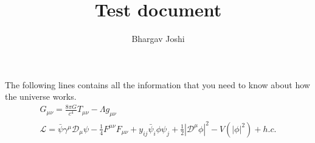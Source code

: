 \documentclass{article}
\author{Bhargav Joshi}
\title{Test document}
\begin{document}
\maketitle
\centering
The following lines contains all the information that you need to know about how the universe works.
\begin{gather}
G_{\mu\nu}=\frac{8\pi G}{c^4}T_{\mu\nu}-\Lambda g_{\mu\nu}\\
\mathcal{L}=\bar{\psi}\gamma^\mu\mathcal{D}_\mu\psi-\frac{1}{4}F^{\mu\nu}F_{\mu\nu}+y_{ij}\bar{\psi}_i\phi\psi_j+\frac{1}{2}|\mathcal{D}^\mu\phi|^2-V(|\phi|^2)+h.c.
\end{gather}
\end{document}
